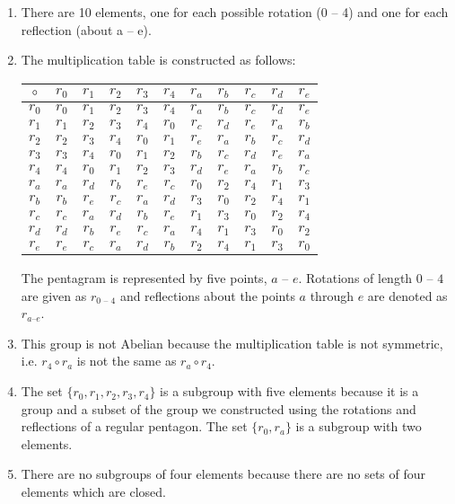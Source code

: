 \documentclass{article}
\begin{document}
\begin{enumerate}
	\item There are 10 elements, one for each possible rotation (0 -- 4) and one for each reflection (about a -- e).
	\item The multiplication table is constructed as follows:
	\begin{center}\begin{tabular}{c | c c c c c c c c c c}
	$\circ$ & $r_0$ & $r_1$ & $r_2$ & $r_3$ &$r_4$ & $r_a$ &$r_b$ & $r_c$ &$r_d$ & $r_e$ \\ \hline
	$r_0$ & $r_0$ & $r_1$ & $r_2$ & $r_3$ &$r_4$ & $r_a$ &$r_b$ & $r_c$ &$r_d$ & $r_e$ \\ 
	$r_1$ & $r_1$ & $r_2$ & $r_3$ & $r_4$ &$r_0$ & $r_c$ &$r_d$ & $r_e$ &$r_a$ & $r_b$ \\ 
	$r_2$ & $r_2$ & $r_3$ & $r_4$ & $r_0$ &$r_1$ & $r_e$ &$r_a$ & $r_b$ &$r_c$ & $r_d$ \\ 
	$r_3$ & $r_3$ & $r_4$ & $r_0$ & $r_1$ &$r_2$ & $r_b$ &$r_c$ & $r_d$ &$r_e$ & $r_a$ \\ 
	$r_4$ & $r_4$ & $r_0$ & $r_1$ & $r_2$ &$r_3$ & $r_d$ &$r_e$ & $r_a$ &$r_b$ & $r_c$ \\ 
	$r_a$ & $r_a$ & $r_d$ & $r_b$ & $r_e$ &$r_c$ & $r_0$ &$r_2$ & $r_4$ &$r_1$ & $r_3$ \\ 
	$r_b$ & $r_b$ & $r_e$ & $r_c$ & $r_a$ &$r_d$ & $r_3$ &$r_0$ & $r_2$ &$r_4$ & $r_1$ \\ 
	$r_c$ & $r_c$ & $r_a$ & $r_d$ & $r_b$ &$r_e$ & $r_1$ &$r_3$ & $r_0$ &$r_2$ & $r_4$ \\ 
	$r_d$ & $r_d$ & $r_b$ & $r_e$ & $r_c$ &$r_a$ & $r_4$ &$r_1$ & $r_3$ &$r_0$ & $r_2$ \\ 
	$r_e$ & $r_e$ & $r_c$ & $r_a$ & $r_d$ &$r_b$ & $r_2$ &$r_4$ & $r_1$ &$r_3$ & $r_0$ \\ 
\end{tabular}\end{center}
The pentagram is represented by five points, $a$ -- $e$. Rotations of length $0$ -- $4$ are given as $r_{\text{0 -- 4}}$ and reflections about the points $a$ through $e$ are denoted as $r_{a \text{--} e}$. 
	\item This group is not Abelian because the multiplication table is not symmetric, i.e. $r_4 \circ r_a$ is not the same as $r_a \circ r_4$.
	\item The set $\{ r_0, r_1, r_2, r_3, r_4\}$ is a subgroup with five elements because it is a group and a subset of the group we constructed using the rotations and reflections of a regular pentagon. The set $\{r_0, r_a\}$ is a subgroup with two elements.
	\item There are no subgroups of four elements because there are no sets of four elements which are closed.
\end{enumerate} 
\end{document}
